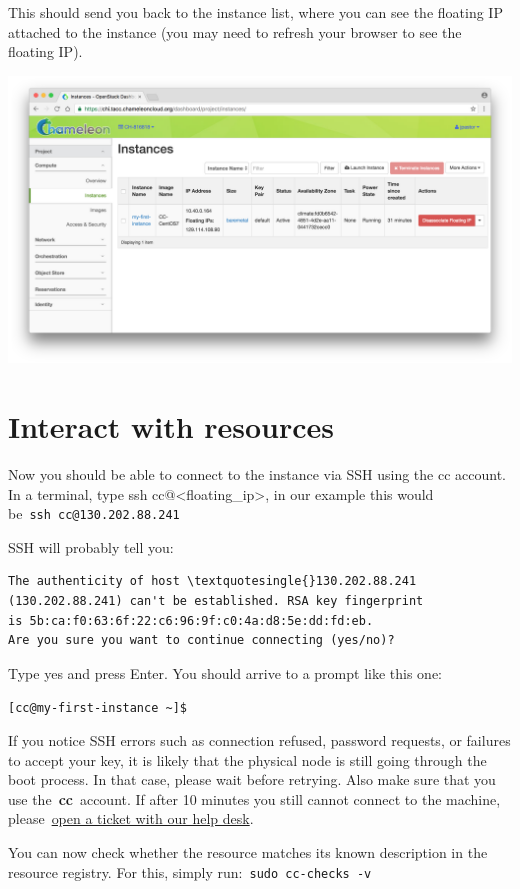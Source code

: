 This should send you back to the instance list, where you can see the
floating IP attached to the instance (you may need to refresh your
browser to see the floating IP).

\includegraphics[width=0.8\columnwidth]{images/chameleon/Screen-Shot-2016-10-26-at-16-26-54.png}

\section{Interact with resources}

Now you should be able to connect to the instance via SSH using the cc
account. In a terminal, type ssh
cc@\textless{}floating\_ip\textgreater{}, in our example this would
be~\texttt{ssh\ cc@130.202.88.241}

SSH will probably tell you:

\begin{verbatim}
The authenticity of host \textquotesingle{}130.202.88.241
(130.202.88.241) can't be established. RSA key fingerprint 
is 5b:ca:f0:63:6f:22:c6:96:9f:c0:4a:d8:5e:dd:fd:eb. 
Are you sure you want to continue connecting (yes/no)?

\end{verbatim}

Type yes and press Enter. You should arrive to a prompt like this one:

\texttt{{[}cc@my-first-instance\ \textasciitilde{}{]}\$}

If you notice SSH errors such as connection refused, password requests,
or failures to accept your key, it is likely that the physical node is
still going through the boot process. In that case, please wait before
retrying. Also make sure that you use the~\textbf{cc}~account. If after
10 minutes you still cannot connect to the machine,
please~\href{https://www.chameleoncloud.org/user/help/}{open a ticket
with our help desk}.

You can now check whether the resource matches its known description in
the resource registry. For this, simply
run:~\texttt{sudo\ cc-checks\ -v}

